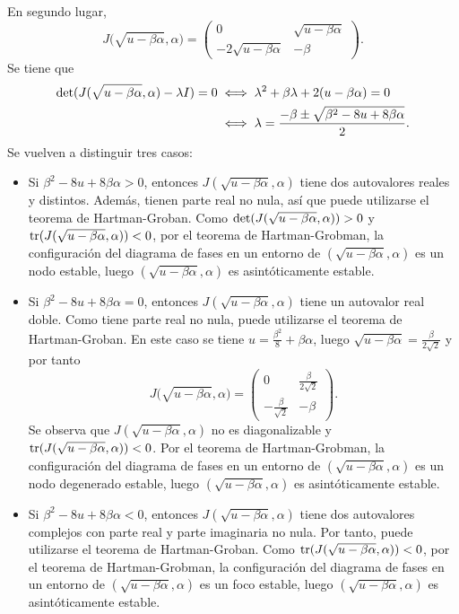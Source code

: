 \documentclass[11pt]{report}
\begin{document}
\begin{solution}
\begin{enumerate}
\begin{itemize}
            En segundo lugar,
            \[J\bigl(\sqrt{u-\beta\alpha},\alpha\bigr) = \left(\begin{array}{cc}
            0 & \sqrt{u-\beta\alpha} \\
            -2\sqrt{u-\beta\alpha} & -\beta
            \end{array}\right).\]
            Se tiene que
            \begin{align*}
                \textup{det}(J(\sqrt{u-\beta\alpha},\alpha)-\lambda I) = 0 &\iff \lambda^2+\beta\lambda+2(u-\beta\alpha) = 0 \\
                &\iff \lambda = \frac{-\beta\pm\sqrt{\beta^2-8u+8\beta\alpha}}{2}.
            \end{align*}
            Se vuelven a distinguir tres casos:
            \begin{itemize}
                \item Si $\beta^2-8u+8\beta\alpha >0$, entonces $J(\sqrt{u-\beta\alpha},\alpha)$ tiene dos autovalores reales y distintos. Además, tienen parte real no nula, así que puede utilizarse el teorema de Hartman-Groban. Como $\textup{det}(J(\sqrt{u-\beta\alpha},\alpha)) > 0$ y $\textup{tr}(J(\sqrt{u-\beta\alpha},\alpha)) < 0$, por el teorema de Hartman-Grobman, la configuración del diagrama de fases en un entorno de $(\sqrt{u-\beta\alpha},\alpha)$ es un nodo estable, luego $(\sqrt{u-\beta\alpha},\alpha)$ es asintóticamente estable.
                \item Si $\beta^2-8u+8\beta\alpha =0$, entonces $J(\sqrt{u-\beta\alpha},\alpha)$ tiene un autovalor real doble. Como tiene parte real no nula, puede utilizarse el teorema de Hartman-Groban. En este caso se tiene $u = \frac{\beta^2}{8}+\beta\alpha$, luego $\sqrt{u-\beta\alpha} = \frac{\beta}{2\sqrt{2}}$ y por tanto
                \[J\bigl(\sqrt{u-\beta\alpha},\alpha\bigr) = \left(\begin{array}{cc}
                0 &  \frac{\beta}{2\sqrt{2}} \\
                -\frac{\beta}{\sqrt{2}} & -\beta
                \end{array}\right).\]
                Se observa que $J(\sqrt{u-\beta\alpha},\alpha)$ no es diagonalizable y $\textup{tr}(J(\sqrt{u-\beta\alpha},\alpha)) < 0$. Por el teorema de Hartman-Grobman, la configuración del diagrama de fases en un entorno de $(\sqrt{u-\beta\alpha},\alpha)$ es un nodo degenerado estable, luego $(\sqrt{u-\beta\alpha},\alpha)$ es asintóticamente estable.
                \item Si $\beta^2-8u+8\beta\alpha <0$, entonces $J(\sqrt{u-\beta\alpha},\alpha)$ tiene dos autovalores complejos con parte real y parte imaginaria no nula. Por tanto, puede utilizarse el teorema de Hartman-Groban. Como $\textup{tr}(J(\sqrt{u-\beta\alpha},\alpha)) < 0$, por el teorema de Hartman-Grobman, la configuración del diagrama de fases en un entorno de $(\sqrt{u-\beta\alpha},\alpha)$ es un foco estable, luego $(\sqrt{u-\beta\alpha},\alpha)$ es asintóticamente estable.

\end{itemize}
\end{itemize}
\end{enumerate}
\end{solution}
\end{document}
